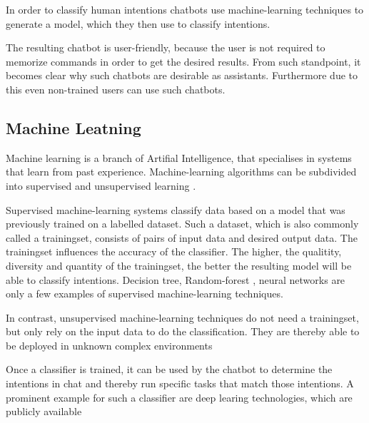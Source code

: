 In order to classify human intentions chatbots use machine-learning techniques to generate a model, which they then use to classify intentions.

The resulting chatbot is user-friendly, because the user is not required to memorize commands in order to get the desired results. From such standpoint, it becomes clear why such chatbots are desirable as assistants. Furthermore due to this even non-trained users can use such chatbots.

\subsection{Machine Leatning}
Machine learning is a branch of Artifial Intelligence, that specialises in systems that learn from past experience. Machine-learning algorithms can be subdivided into supervised and unsupervised learning \cite{MiBu16}.

Supervised machine-learning systems classify data based on a model that was previously trained on a labelled dataset. Such a dataset, which is also commonly called a trainingset, consists of pairs of input data and desired output data. The trainingset influences the accuracy of the classifier. The higher, the qualitity, diversity and quantity of the trainingset, the better the resulting model will be able to classify intentions. Decision tree, Random-forest \cite{Brei01}, neural networks are only a few examples of supervised machine-learning techniques.

In contrast, unsupervised machine-learning techniques do not need a trainingset, but only rely on the input data to do the classification.
They are thereby able to be deployed in unknown complex environments \cite{Adam17}

Once a classifier is trained, it can be used by the chatbot to determine the intentions in chat and thereby run specific tasks that match those intentions.
A prominent example for such a classifier are deep learing technologies, which are publicly available \cite{NLKl19}